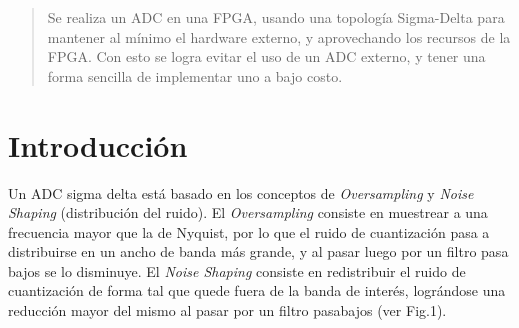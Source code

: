 \documentclass[a4paper,conference]{IEEEtran}
\begin{document}




\maketitle


\begin{abstract}
Se realiza un ADC en una FPGA, usando una topología Sigma-Delta para mantener al mínimo el hardware externo, y aprovechando los recursos de la FPGA. Con esto se logra evitar el uso de un ADC externo, y tener una forma sencilla de implementar uno a bajo costo.
\end{abstract}





%
\IEEEpeerreviewmaketitle



\section{Introducci\'on}
Un ADC sigma delta est\'a basado en los conceptos de \textit{Oversampling} y \textit{Noise Shaping} (distribuci\'on del ruido). El \textit{Oversampling} consiste en muestrear a una frecuencia mayor que la de Nyquist, por lo que el ruido de cuantizaci\'on pasa a distribuirse en un ancho de banda m\'as grande, y al pasar luego por un filtro pasa bajos se lo disminuye. El \textit{Noise Shaping} consiste en redistribuir el ruido de cuantizaci\'on de forma tal que quede fuera de la banda de inter\'es, logr\'andose una reducción mayor del mismo al pasar por un filtro pasabajos (ver Fig.1).
\end{document}
